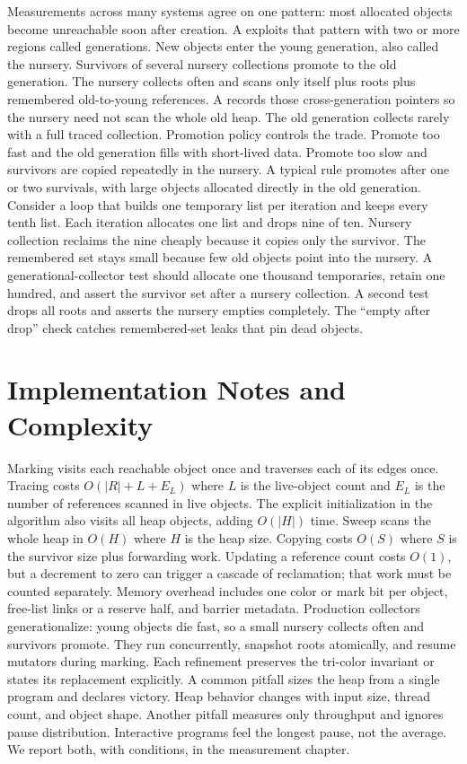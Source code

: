 Measurements across many systems agree on one pattern: most allocated objects become unreachable soon after creation.
A  exploits that pattern with two or more regions called generations.
New objects enter the young generation, also called the nursery.
Survivors of several nursery collections promote to the old generation.
The nursery collects often and scans only itself plus roots plus remembered old-to-young references.
A  records those cross-generation pointers so the nursery need not scan the whole old heap.
The old generation collects rarely with a full traced collection.
Promotion policy controls the trade.
Promote too fast and the old generation fills with short-lived data.
Promote too slow and survivors are copied repeatedly in the nursery.
A typical rule promotes after one or two survivals, with large objects allocated directly in the old generation.
Consider a loop that builds one temporary list per iteration and keeps every tenth list.
Each iteration allocates one list and drops nine of ten.
Nursery collection reclaims the nine cheaply because it copies only the survivor.
The remembered set stays small because few old objects point into the nursery.
A generational-collector test should allocate one thousand temporaries, retain one hundred, and assert the survivor set after a nursery collection.
A second test drops all roots and asserts the nursery empties completely.
The \enquote{empty after drop} check catches remembered-set leaks that pin dead objects.

\section{Implementation Notes and Complexity}\label{sec:ch33-implementation}

Marking visits each reachable object once and traverses each of its edges once.
Tracing costs $O(|R|+L+E_L)$ where $L$ is the live-object count and $E_L$ is the number of references scanned in live objects.
The explicit initialization in the algorithm also visits all heap objects, adding $O(|H|)$ time.
Sweep scans the whole heap in $O(H)$ where $H$ is the heap size.
Copying costs $O(S)$ where $S$ is the survivor size plus forwarding work.
Updating a reference count costs $O(1)$, but a decrement to zero can trigger a cascade of reclamation; that work must be counted separately.
Memory overhead includes one color or mark bit per object, free-list links or a reserve half, and barrier metadata.
Production collectors generationalize: young objects die fast, so a small nursery collects often and survivors promote.
They run concurrently, snapshot roots atomically, and resume mutators during marking.
Each refinement preserves the tri-color invariant or states its replacement explicitly.
A common pitfall sizes the heap from a single program and declares victory.
Heap behavior changes with input size, thread count, and object shape.
Another pitfall measures only throughput and ignores pause distribution.
Interactive programs feel the longest pause, not the average.
We report both, with conditions, in the measurement chapter.


